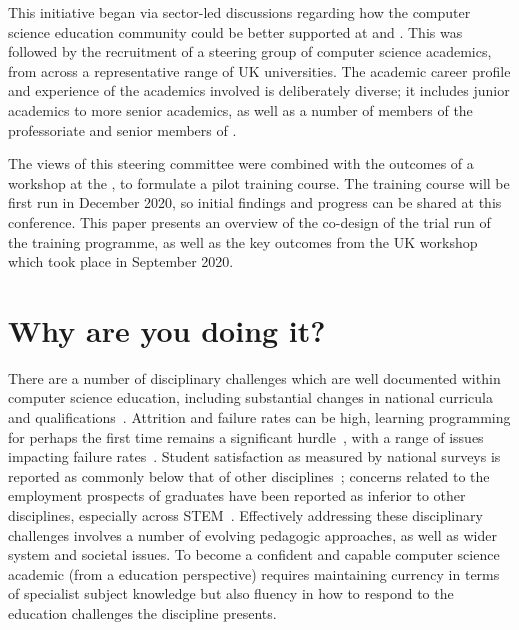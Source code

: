 \documentclass[sigconf]{acmart}
\begin{document}
This initiative began via sector-led discussions regarding how the computer science education community could be better supported at  and . This was followed by the recruitment of a steering group of computer science academics, from across a representative range of UK universities. The academic career profile and experience of the academics involved is deliberately diverse; it includes junior academics to more senior academics, as well as a number of members of the professoriate and senior members of . \begin{comment}
content...
The group also includes a number of computer science academics who have been recognised as National Teaching Fellows by Advance HE. 
\end{comment}
The views of this steering committee were combined with the outcomes of a workshop at the , to formulate a pilot training course. The training course will be first run in December 2020, so initial findings and progress can be shared at this conference. This paper presents an overview of the co-design of the trial run of the training programme, as well as the key outcomes from the UK workshop which took place in September 2020.


\section{Why are you doing it?}
There are a number of disciplinary challenges which are well documented within computer science education, including substantial changes in national curricula and qualifications~\cite{brown-et-al-toce2014}. Attrition and failure rates can be high, learning programming for perhaps the first time remains a significant hurdle~\cite{davenport-et-al:latice2016,murphy-et-al:programming2017,simon-et-al:sigcse2018}, with a range of issues impacting failure rates~\cite{Watson:2014:FRI:2591708.2591749,prickett-et-al:iticse2020}. Student satisfaction as measured by national surveys is reported as commonly below that of other disciplines~\cite{Sinclair2015}; concerns related to the employment prospects of graduates have been reported as inferior to other disciplines, especially across STEM~\cite{shadbolt2016shadbolt}. Effectively addressing these disciplinary challenges involves a number of evolving pedagogic approaches, as well as wider system and societal issues. To become a confident and capable computer science academic (from a education perspective) requires maintaining currency in terms of specialist subject knowledge but also fluency in how to respond to the education challenges the discipline presents. %
\end{document}
